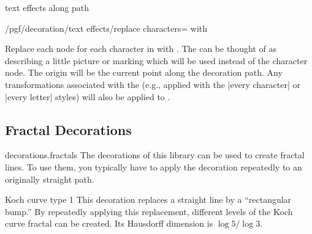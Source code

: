 \begin{decoration}{text effects along path}
\begin{key}{/pgf/decoration/text effects/replace characters= with }

  Replace each node for each  character in  with . 
  The  can be thought of as describing
  a little picture or marking which will be
  used instead of the character node. 
  The origin will be the current point along the 
  decoration path.
  Any transformations associated with
  the  (e.g., applied with the |every character|
  or |every letter| styles) will also be applied to .
  
\begin{codeexample}[]
\end{codeexample}

\end{key}
\end{decoration}

\subsection{Fractal Decorations}

\begin{pgflibrary}{decorations.fractals}
  The decorations of this library can be used to create fractal
  lines. To use them, you typically have to apply the decoration
  repeatedly to an originally straight path.
\end{pgflibrary}


\begin{decoration}{Koch curve type 1}
  This decoration replaces a straight line by a ``rectangular bump.''
  By repeatedly applying this replacement, different levels of the
  Koch curve fractal can be created. Its Hausdorff dimension is $\log
  5/\log 3$.
\begin{codeexample}[]
\end{codeexample}
\end{decoration}


